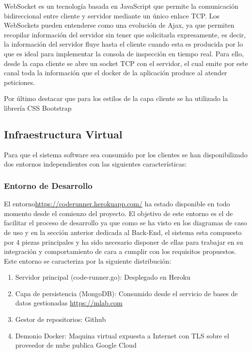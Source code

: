 \documentclass[a4paper,11pt]{book}
\begin{document}
WebSocket es un tecnología basada en JavaScript que permite la comunicación bidireccional entre cliente y servidor mediante un único enlace TCP. Los WebSockets pueden entenderse como una evolución de Ajax, ya que permiten recopilar información del servidor sin tener que solicitarla expresamente, es decir, la información del servidor fluye hasta el cliente cuando esta es producida por lo que es ideal para implementar la consola de inspección en tiempo real. Para ello, desde la capa cliente se abre un socket TCP con el servidor, el cual emite por este canal toda la información que el docker de la aplicación produce al atender peticiones.  

Por último destacar que para los estilos de la capa cliente se ha utilizado la librería CSS Bootstrap\cite{boot}

\subsection{Infraestructura Virtual}\label{iv}

Para que el sistema software sea consumido por los clientes se han disponibilizado dos entornos independientes con las siguientes características:

\subsubsection{Entorno de Desarrollo}

El entorno\url{https://coderunner.herokuapp.com/} ha estado disponible en todo momento desde el comienzo del proyecto. El objetivo de este entorno es el de facilitar el proceso de desarrollo ya que  como se ha visto en los diagramas de caso de uso y en la sección anterior dedicada al Back-End, el sistema esta compuesto por 4 piezas principales y ha sido necesario disponer de ellas para trabajar en su integración y comportamiento de cara a cumplir con los requisitos propuestos. Este entorno se caracteriza por la siguiente distribución: 


\begin{enumerate}
\item Servidor principal (code-runner.go): Desplegado en Heroku\cite{hero}
\item Capa de persistencia (MongoDB): Consumido desde el servicio de bases de datos gestionadas \url{https://mlab.com}
\item Gestor de repositorios: Github\cite{github}
\item Demonio Docker: Maquina virtual expuesta a Internet con TLS sobre el proveedor de nube publica Google Cloud\cite{gcp}
\end{enumerate}
\end{document}
